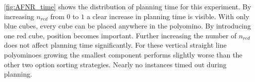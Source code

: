\autoref{fig:AFNR_time} shows the distribution of planning time for this experiment.
By increasing $n_\textit{red}$ from $0$ to $1$ a clear increase in planning time is visible.
With only blue cubes, every cube can be placed anywhere in the polyomino.
By introducing one red cube, position becomes important.
Further increasing the number of $n_\textit{red}$ does not affect planning time significantly.
For these vertical straight line polyominoes growing the smallest component performs slightly worse than the other two option sorting strategies.
Nearly no instances timed out during planning. 



